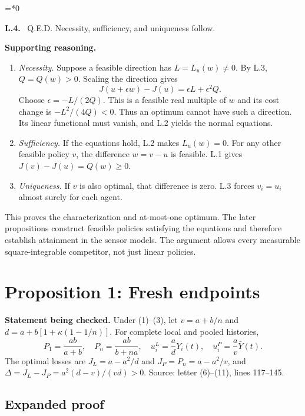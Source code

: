 \documentclass[12pt,letterpaper]{article}
\newenvironment{proofstep}[2]{%
  \begin{list}{}{\leftmargin=\dimexpr 0.17in*#2\relax%
  \setlength{\rightmargin}{0pt}\setlength{\topsep}{5pt}\setlength{\parsep}{2pt}}%
  \item[]\textbf{\textcolor{ink}{#1.}}\ }{\end{list}}
\begin{document}
\begin{proofstep}{L.4}{0}
\label{step:L.4}
Q.E.D. Necessity, sufficiency, and uniqueness follow.

\textbf{Supporting reasoning.}
\begin{enumerate}
\item \emph{Necessity.} Suppose a feasible direction has $L=L_u(w)\ne0$. By L.3, $Q=Q(w)>0$. Scaling the direction gives
\[
J(u+\epsilon w)-J(u)=\epsilon L+\epsilon^2Q.
\]
Choose $\epsilon=-L/(2Q)$. This is a feasible real multiple of $w$ and its cost change is $-L^2/(4Q)<0$. Thus an optimum cannot have such a direction. Its linear functional must vanish, and L.2 yields the normal equations.
\item \emph{Sufficiency.} If the equations hold, L.2 makes $L_u(w)=0$. For any other feasible policy $v$, the difference $w=v-u$ is feasible. L.1 gives $J(v)-J(u)=Q(w)\ge0$.
\item \emph{Uniqueness.} If $v$ is also optimal, that difference is zero. L.3 forces $v_i=u_i$ almost surely for each agent.
\end{enumerate}
This proves the characterization and at-most-one optimum. The later propositions construct feasible policies satisfying the equations and therefore establish attainment in the sensor models. The argument allows every measurable square-integrable competitor, not just linear policies.
\par{}
\end{proofstep}

\clearpage
\section{Proposition 1: Fresh endpoints}\label{contract-P}

\textbf{Statement being checked.}
Under (1)--(3), let $v=a+b/n$ and $d=a+b[1+\kappa(1-1/n)]$. For complete local and pooled histories,
\[
P_1=\frac{ab}{a+b},\quad P_n=\frac{ab}{b+na},\quad
u_i^L=\frac adY_i(t),\quad u_i^P=\frac av\bar Y(t).
\]
The optimal losses are $J_L=a-a^2/d$ and $J_P=P_n=a-a^2/v$, and $\Delta=J_L-J_P=a^2(d-v)/(vd)>0$.
\noindent Source: letter (6)--(11), lines 117--145.

\subsection*{Expanded proof}
\end{document}
